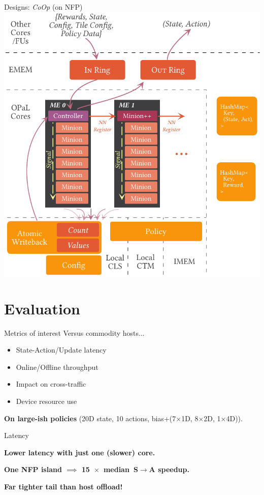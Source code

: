 \documentclass[aspectratio=169,xcolor={dvipsnames}
,handout
]{beamer}
\begin{document}
\begin{frame}{Designs: \emph{CoOp} (on NFP)}
	\centering
	\includegraphics[width=0.535\linewidth]{../paper/figures/coop}
\end{frame}

\section{Evaluation}

\begin{frame}{Metrics of interest}
	Versus commodity hosts...
	\begin{itemize}[<+->]
		\item State-Action/Update latency
		\item Online/Offline throughput
		\item Impact on cross-traffic
		\item Device resource use
	\end{itemize}\pause
	\textbf{On large-ish policies} (20D state, 10 actions, bias+(7$\times$1D, 8$\times$2D, 1$\times$4D)).
\end{frame}

\begin{frame}{Latency}
	\centering
	\pause
	
	\textbf{Lower latency with \alert{just one (slower) core}.}\pause
	
	\textbf{One NFP island $\implies$ \alert{\SI{15}{$\times$} median S$\rightarrow$A speedup}.}\pause
	
	\textbf{Far tighter tail than host offload!}
\end{frame}
\end{document}

